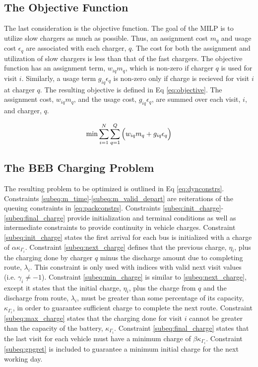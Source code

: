 \documentclass[letterpaper, 10pt, conference]{IEEEtran}
\begin{document}
\subsection{The Objective Function} \label{sec:objective-function}
The last consideration is the objective function. The goal of the MILP is to utilize slow chargers as much as possible.
Thus, an assignment cost $m_q$ and usage cost $\epsilon_q$ are associated with each charger, $q$. The cost for both the
assignment and utilization of slow chargers is less than that of the fast chargers. The objective function has an
assignment term, $w_{iq}m_q$, which is non-zero if charger $q$ is used for visit $i$. Similarly, a usage term $g_{iq}
\epsilon_q$ is non-zero only if charge is recieved for visit $i$ at charger $q$. The resulting objective is defined in Eq
\ref{eq:objective}. The assignment cost, $w_{iq}m_q$, and the usage cost, $g_{iq}\epsilon_q$, are summed over each visit, $i$,
and charger, $q$.

\begin{equation}
\label{eq:objective}
	\min \sum_{i=1}^N \sum_{q=1}^Q \Big( w_{iq} m_q + g_{iq} \epsilon_q \Big) \\
\end{equation}

\subsection{The BEB Charging Problem}
The resulting problem to be optimized is outlined in Eq \ref{eq:dynconstrs}. Constraints
\eqref{subeq:m_time}-\eqref{subeq:m_valid_depart} are reiterations of the queuing constraints in \eqref{eq:packconstrs}.
Constraints \eqref{subeq:init_charge}-\eqref{subeq:final_charge} provide initialization and terminal conditions as well
as intermediate constraints to provide continuity in vehicle charges. Constraint \eqref{subeq:init_charge} states the
first arrival for each bus is initialized with a charge of $\alpha \kappa_{\Gamma_i}$. Constraint \eqref{subeq:next_charge} defines
that the previous charge, $\eta_i$, plus the charging done by charger $q$ minus the discharge amount due to completing
route, $\lambda_i$. This constraint is only used with indices with valid next visit values (i.e. $\gamma_i \neq -1$). Constraint
\eqref{subeq:min_charge} is similar to \eqref{subeq:next_charge}, except it states that the initial charge, $\eta_i$, plus
the charge from $q$ and the discharge from route, $\lambda_i$, must be greater than some percentage of its capacity,
$\kappa_{\Gamma_i}$, in order to guarantee sufficient charge to complete the next route. Constraint \eqref{subeq:max_charge}
states that the charging done for visit $i$ cannot be greater than the capacity of the battery, $\kappa_{\Gamma_i}$. Constraint
\eqref{subeq:final_charge} states that the last visit for each vehicle must have a minimum charge of $\beta \kappa_{\Gamma_i}$.
Constraint \eqref{subeq:gpgret} is included to guarantee a minimum initial charge for the next working day.
\end{document}
